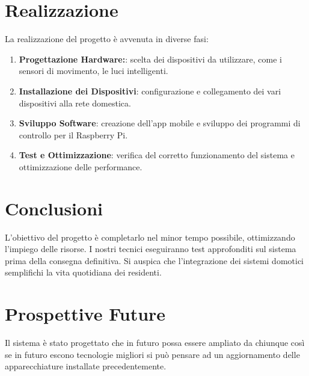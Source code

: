 \documentclass[a4paper,12pt]{article}
\begin{document}
\section{Realizzazione}
La realizzazione del progetto è avvenuta in diverse fasi:
\begin{enumerate}
    \item \textbf{Progettazione Hardware:}: scelta dei dispositivi da utilizzare, come i sensori di movimento, le luci intelligenti.
    \item \textbf{Installazione dei Dispositivi}: configurazione e collegamento dei vari dispositivi alla rete domestica.
    \item \textbf{Sviluppo Software}: creazione dell'app mobile e sviluppo dei programmi di controllo per il Raspberry Pi.
    \item \textbf{Test e Ottimizzazione}: verifica del corretto funzionamento del sistema e ottimizzazione delle performance.
\end{enumerate}

\section{Conclusioni}
L’obiettivo del progetto è completarlo nel minor tempo possibile, ottimizzando l’impiego delle risorse. I nostri tecnici eseguiranno test approfonditi sul sistema prima della consegna definitiva. Si auspica che l’integrazione dei sistemi domotici semplifichi la vita quotidiana dei residenti.

\section{Prospettive Future}
Il sistema è stato progettato che in futuro possa essere ampliato da chiunque così se in futuro escono tecnologie migliori si può pensare ad un aggiornamento delle apparecchiature installate precedentemente.
\end{document}
